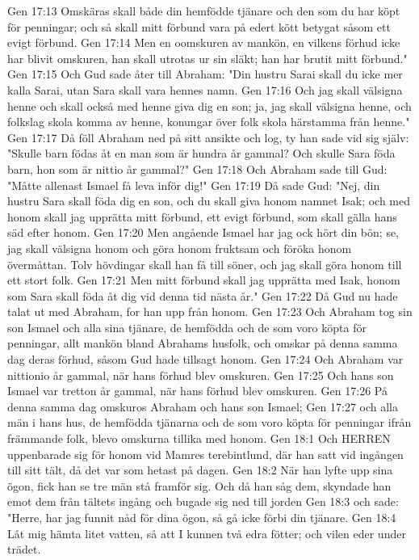 Gen 17:13  Omskäras skall både din hemfödde tjänare och den som du har köpt för penningar; och så skall mitt förbund vara på edert kött betygat såsom ett evigt förbund.
Gen 17:14  Men en oomskuren av mankön, en vilkens förhud icke har blivit omskuren, han skall utrotas ur sin släkt; han har brutit mitt förbund."
Gen 17:15  Och Gud sade åter till Abraham: "Din hustru Sarai skall du icke mer kalla Sarai, utan Sara skall vara hennes namn.
Gen 17:16  Och jag skall välsigna henne och skall också med henne giva dig en son; ja, jag skall välsigna henne, och folkslag skola komma av henne, konungar över folk skola härstamma från henne."
Gen 17:17  Då föll Abraham ned på sitt ansikte och log, ty han sade vid sig själv: "Skulle barn födas åt en man som är hundra år gammal? Och skulle Sara föda barn, hon som är nittio år gammal?"
Gen 17:18  Och Abraham sade till Gud: "Måtte allenast Ismael få leva inför dig!"
Gen 17:19  Då sade Gud: "Nej, din hustru Sara skall föda dig en son, och du skall giva honom namnet Isak; och med honom skall jag upprätta mitt förbund, ett evigt förbund, som skall gälla hans säd efter honom.
Gen 17:20  Men angående Ismael har jag ock hört din bön; se, jag skall välsigna honom och göra honom fruktsam och föröka honom övermåttan. Tolv hövdingar skall han få till söner, och jag skall göra honom till ett stort folk.
Gen 17:21  Men mitt förbund skall jag upprätta med Isak, honom som Sara skall föda åt dig vid denna tid nästa år."
Gen 17:22  Då Gud nu hade talat ut med Abraham, for han upp från honom.
Gen 17:23  Och Abraham tog sin son Ismael och alla sina tjänare, de hemfödda och de som voro köpta för penningar, allt mankön bland Abrahams husfolk, och omskar på denna samma dag deras förhud, såsom Gud hade tillsagt honom.
Gen 17:24  Och Abraham var nittionio år gammal, när hans förhud blev omskuren.
Gen 17:25  Och hans son Ismael var tretton år gammal, när hans förhud blev omskuren.
Gen 17:26  På denna samma dag omskuros Abraham och hans son Ismael;
Gen 17:27  och alla män i hans hus, de hemfödda tjänarna och de som voro köpta för penningar ifrån främmande folk, blevo omskurna tillika med honom.
Gen 18:1  Och HERREN uppenbarade sig för honom vid Mamres terebintlund, där han satt vid ingången till sitt tält, då det var som hetast på dagen.
Gen 18:2  När han lyfte upp sina ögon, fick han se tre män stå framför sig. Och då han såg dem, skyndade han emot dem från tältets ingång och bugade sig ned till jorden
Gen 18:3  och sade: "Herre, har jag funnit nåd för dina ögon, så gå icke förbi din tjänare.
Gen 18:4  Låt mig hämta litet vatten, så att I kunnen två edra fötter; och vilen eder under trädet.

